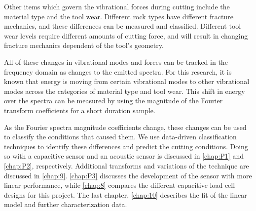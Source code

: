 Other items which govern the vibrational forces during cutting include
the material type and the tool wear. 
Different rock types have different fracture mechanics, 
and these differences can be measured and classified.
Different tool wear levels require different amounts of cutting force,
and will result in changing fracture mechanics dependent of the tool's geometry.

All of these changes in vibrational modes and forces can be tracked in the
frequency domain as changes to the emitted spectra. For this research,
it is known that energy is moving from certain vibrational
modes to other vibrational modes across the categories of material type
and tool wear. This shift in energy over the spectra can be measured
by using the magnitude of the Fourier transform coefficients for a 
short duration sample.

As the Fourier spectra magnitude coefficients change, these changes 
can be used to classify the conditions that caused them.
We use data-driven classification techniques to identify these differences and 
predict the cutting conditions.
Doing so with a capacitive sensor and an acoustic sensor
is discussed in \ref{chap:P1} and \ref{chap:P2}, respectively.
Additional transforms and variations of the technique are discussed in \ref{chap:9}.
\ref{chap:P3} discusses the development of the sensor with more linear performance, 
while \ref{chap:8} compares the different capacitive load cell designs for this project.
The last chapter, \ref{chap:10} describes the fit of the linear model and 
further characterization data.

